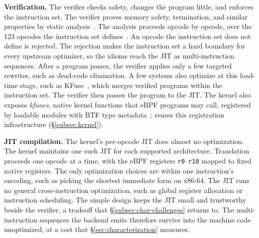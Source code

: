 \noindent\textbf{Verification.}
The verifier checks safety, changes the program little, and enforces the instruction set.
The verifier proves memory safety, termination, and similar properties by static analysis~\cite{gershuni2019simple}.
The analysis proceeds opcode by opcode, over the 123 opcodes the instruction set defines~\cite{rfc9669}.
An opcode the instruction set does not define is rejected.
The rejection makes the instruction set a hard boundary for every upstream optimizer, so the idioms reach the JIT as multi-instruction sequences.
After a program passes, the verifier applies only a few targeted rewrites, such as dead-code elimination.
A few systems also optimize at this load-time stage, such as KFuse~\cite{kfuse}, which merges verified programs within the instruction set.
The verifier then passes the program to the JIT.
The kernel also exposes \emph{kfuncs}, native kernel functions that eBPF programs may call, registered by loadable modules with BTF type metadata~\cite{kfuncs}; \tool reuses this registration infrastructure (\S\ref{subsec:kernel}).

\noindent\textbf{JIT compilation.}
The kernel's per-opcode JIT does almost no optimization.
The kernel maintains one such JIT for each supported architecture.
Translation proceeds one opcode at a time, with the eBPF registers \texttt{r0}--\texttt{r10} mapped to fixed native registers.
The only optimization choices are within one instruction's encoding, such as picking the shortest immediate form on x86-64.
The JIT runs no general cross-instruction optimization, such as global register allocation or instruction scheduling.
The simple design keeps the JIT small and trustworthy beside the verifier, a tradeoff that \S\ref{subsec:char-challenges} returns to.
The multi-instruction sequences the backend emits therefore survive into the machine code unoptimized, at a cost that \S\ref{sec:characterization} measures.
